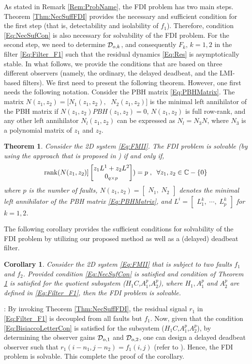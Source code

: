 \documentclass[journal,12pt,draftcls,onecolumn]{IEEEtran}
\newcommand{\bbm}{\begin{bmatrix}}
\newcommand{\ebm}{\end{bmatrix}}
\newcommand{\rank}{\mathrm{rank}}
\def\QEDclosed{\hfill\IEEEQEDclosed}
\renewcommand{\qed}{\QEDclosed}
\renewenvironment{proof}[1][\proofname]{\noindent\nobreakspace{\bfseries #1}:\;}{\qed\par}
\newtheorem{theorem}{Theorem}
\newtheorem{corollary}{Corollary}
\begin{document}
	As stated in Remark \ref{Rem:ProbName}, the FDI problem has two main steps. Theorem \ref{Thm:NecSuffFDI} provides the necessary and sufficient condition for the first step (that is, detectability and isolability of $f_1$). Therefore,  condition \eqref{Eq:NecSufCon} is also necessary for solvability of the FDI problem. For the second step, we need to determine $\mathcal{D}_{o,k}$, and consequently $F_k$, $k=1,2$ in the filter \eqref{Eq:Filter_F1} such that the residual dynamics \eqref{Eq:Res} is asymptotically stable. 
	In what follows, we provide the conditions that are based on three different observers (namely, the ordinary, the delayed deadbeat, and the LMI-based filters). We first need to present the following theorem. However, one first needs the following notation. Consider the PBH matrix \eqref{Eq:PBHMatrix}. The matrix $N(z_1,z_2) = [ N_{1}(z_1,z_2),$ $\;N_{2}(z_1,z_2)]$ is the minimal left annihilator of the PBH matrix if $N(z_1,z_2)PBH(z_1,z_2) = 0$, $N(z_1,z_2)$ is full row-rank, and any other left annihilator $N_l(z_1,z_2)$ can be expressed as $N_l = N_3N$, where $N_3$ is a polynomial matrix of $z_1$ and $z_2$.
\begin{theorem}\cite{BisiaccoLetter}\label{Thm:BisiacoLetter}
	Consider the 2D system \eqref{Eq:FMII}. The FDI problem is solvable (by using the approach that is proposed in \cite{BisiaccoLetter}) if and only if,
	\begin{equation}\label{Eq:BisiaccoLetterCon}
		\rank(N(z_1,z_2)]\bbm z_1L^1+z_2L^2\\
		0_{q\times  p}\ebm) = p\;,\;\;\forall z_1,z_2\in\fld{C}-\{0\}
	\end{equation}
	where $p$ is the number of faults, $N(z_1,z_2)=\bbm N_1,\;N_2\ebm$ denotes the minimal left annihilator of the PBH matrix  \eqref{Eq:PBHMatrix}, and $L^i = \bbm L_1^k,\;\cdots,\;L_p^k\ebm$ for $k=1,2$.
\end{theorem}

The following corollary provides the sufficient conditions for solvability of the FDI problem by utilizing  our proposed method as well as a (delayed) deadbeat filter.
\begin{corollary}\label{Col:FDI_DelayedDeadBeat_Suff}
	Consider the 2D system \eqref{Eq:FMII} that is subject to two faults $f_1$ and $f_2$. Provided condition \eqref{Eq:NecSufCon} is satisfied and  condition of Theorem \ref{Thm:BisiacoLetter} is satisfied for the quotient subsystem ($H_1C$,$A_1^p$,$A_2^p$), where $H_1,A_1^p$ and $A_2^p$ are defined in \eqref{Eq:Filter_F1}, then  the FDI problem is solvable. \end{corollary}
\begin{proof}
	 By invoking Theorem \ref{Thm:NecSuffFDI},  the residual signal $r_1$ in \eqref{Eq:Filter_F1} is decoupled from all faults but $f_1$. Now, given that the condition \eqref{Eq:BisiaccoLetterCon} is satisfied for the subsystem ($H_1C$,$A_1^p$,$A_2^p$), by determining the observer gains $\mathcal{D}_{o,1}$ and $\mathcal{D}_{o,2}$, one can  design a delayed deadbeat observer such that $r_1(i-n_1,j-n_2)=f_1(i,j)$ (refer to \cite[Theorem 1]{BisiaccoLetter}). Hence, the FDI problem is solvable. This complete the proof of the corollary.
\end{proof}
\end{document}
